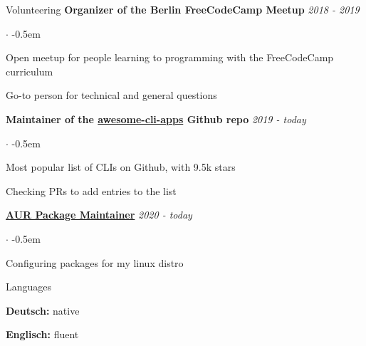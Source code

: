 \documentclass{cv}
\begin{document}
\begin{rSection}{Volunteering}
  {\bf Organizer of the Berlin FreeCodeCamp Meetup}
  \hfill
  {\em 2018 - 2019}

  \begin{list}{$\cdot$}{}
    \itemsep -0.5em \vspace{-0.5em}
    \smallskip
    \item Open meetup for people learning to programming with the FreeCodeCamp curriculum
    \item Go-to person for technical and general questions
  \end{list}

  {\bf Maintainer of the \href{https://github.com/agarrharr/awesome-cli-apps}{awesome-cli-apps} Github repo}
  \hfill
  {\em 2019 - today}

  \begin{list}{$\cdot$}{}
    \itemsep -0.5em \vspace{-0.5em}
    \smallskip
    \item Most popular list of CLIs on Github, with 9.5k stars
    \item Checking PRs to add entries to the list
  \end{list}

  {\bf \href{https://aur.archlinux.org/packages/?SeB=m&K=jneidel}{AUR Package Maintainer}}
  \hfill
  {\em 2020 - today}

  \begin{list}{$\cdot$}{}
    \itemsep -0.5em \vspace{-0.5em}
    \smallskip
    \item Configuring packages for my linux distro
  \end{list}
\end{rSection}

\begin{rSection}{Languages}
  \begin{minipage}[l]{0.48\linewidth}
  {\bf Deutsch:} native
  \end{minipage}
  \begin{minipage}[l]{0.48\linewidth}
  {\bf Englisch:} fluent \hfill
  \end{minipage}
\end{rSection}
\end{document}
